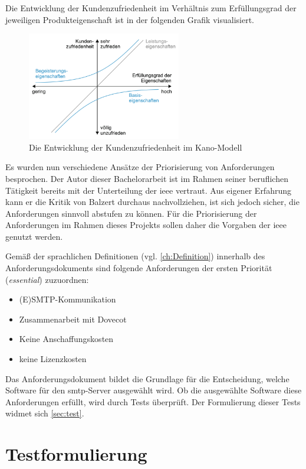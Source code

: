 Die Entwicklung der Kundenzufriedenheit im Verhältnis zum Erfüllungsgrad der jeweiligen Produkteigenschaft ist in der folgenden Grafik visualisiert.

\begin{figure}[H]
  \centering
  \includegraphics[width=0.6\textwidth]{res/kano.png}
  \caption{Die Entwicklung der Kundenzufriedenheit im Kano-Modell \citep[][544]{Balzert2010}}
  \label{fig:Kanomodell}
\end{figure}

Es wurden nun verschiedene Ansätze der Priorisierung von Anforderungen besprochen. Der Autor dieser Bachelorarbeit ist im Rahmen seiner beruflichen Tätigkeit bereits mit der Unterteilung der \ac{ieee} vertraut. Aus eigener Erfahrung kann er die Kritik von Balzert durchaus nachvollziehen, ist sich jedoch sicher, die Anforderungen sinnvoll abstufen zu können. Für die Priorisierung der Anforderungen im Rahmen dieses Projekts sollen daher die Vorgaben der \ac{ieee} genutzt werden.

Gemäß der sprachlichen Definitionen (vgl. \autoref{ch:Definition}) innerhalb des Anforderungsdokuments sind folgende Anforderungen der ersten Priorität (\textit{essential}) zuzuordnen:
\begin{itemize}
	\item (E)SMTP-Kommunikation
	\item Zusammenarbeit mit Dovecot
	\item Keine Anschaffungskosten
	\item keine Lizenzkosten
\end{itemize}

Das Anforderungsdokument bildet die Grundlage für die Entscheidung, welche Software für den \ac{smtp}-Server ausgewählt wird. Ob die ausgewählte Software diese Anforderungen erfüllt, wird durch Tests überprüft. Der Formulierung dieser Tests widmet sich \autoref{sec:test}.

\section{Testformulierung}
\label{sec:test}

